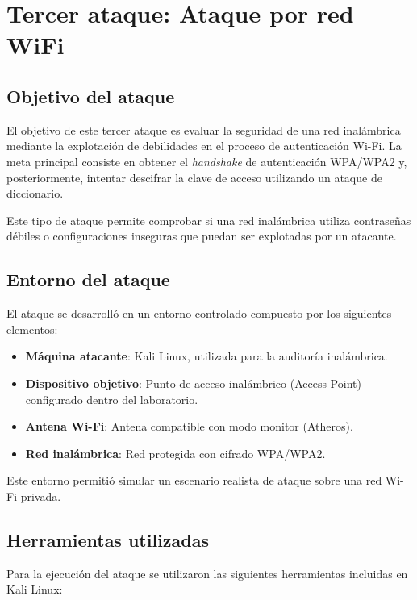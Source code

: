 \section{Tercer ataque: Ataque por red WiFi}

\subsection{Objetivo del ataque}

El objetivo de este tercer ataque es evaluar la seguridad de una red inalámbrica mediante la explotación de debilidades en el proceso de autenticación Wi-Fi.  
La meta principal consiste en obtener el \textit{handshake} de autenticación WPA/WPA2 y, posteriormente, intentar descifrar la clave de acceso utilizando un ataque de diccionario.

Este tipo de ataque permite comprobar si una red inalámbrica utiliza contraseñas débiles o configuraciones inseguras que puedan ser explotadas por un atacante.

\subsection{Entorno del ataque}

El ataque se desarrolló en un entorno controlado compuesto por los siguientes elementos:

\begin{itemize}
    \item \textbf{Máquina atacante}: Kali Linux, utilizada para la auditoría inalámbrica.
    \item \textbf{Dispositivo objetivo}: Punto de acceso inalámbrico (Access Point) configurado dentro del laboratorio.
    \item \textbf{Antena Wi-Fi}: Antena compatible con modo monitor (Atheros).
    \item \textbf{Red inalámbrica}: Red protegida con cifrado WPA/WPA2.
\end{itemize}

Este entorno permitió simular un escenario realista de ataque sobre una red Wi-Fi privada.

\subsection{Herramientas utilizadas}

Para la ejecución del ataque se utilizaron las siguientes herramientas incluidas en Kali Linux:

